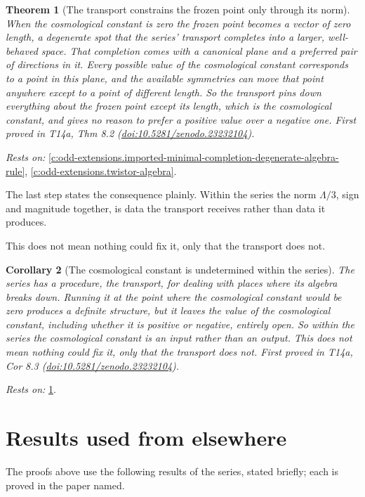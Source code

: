 \documentclass[11pt]{article}
\newtheorem{theorem}{Theorem}[section]
\newtheorem{corollary}[theorem]{Corollary}
\theoremstyle{definition}
\theoremstyle{plain}
\begin{document}
\begin{theorem}[The transport constrains the frozen point only through its norm]\label{c:odd-extensions.transport-constrains-frozen-point-only-through}
When the cosmological constant is zero the frozen point becomes a vector of zero length, a degenerate spot that the series' transport completes into a larger, well-behaved space. That completion comes with a canonical plane and a preferred pair of directions in it. Every possible value of the cosmological constant corresponds to a point in this plane, and the available symmetries can move that point anywhere except to a point of different length. So the transport pins down everything about the frozen point except its length, which is the cosmological constant, and gives no reason to prefer a positive value over a negative one.
\emph{First proved in} T14a, Thm 8.2 (\href{https://doi.org/10.5281/zenodo.23232104}{doi:10.5281/zenodo.23232104}).
\end{theorem}
\noindent\emph{Rests on:} \ref{c:odd-extensions.imported-minimal-completion-degenerate-algebra-rule}, \ref{c:odd-extensions.twistor-algebra}.

The last step states the consequence plainly. Within the series the norm $\Lambda/3$, sign and magnitude together, is data the transport receives rather than data it produces.

This does not mean nothing could fix it, only that the transport does not.

\begin{corollary}[The cosmological constant is undetermined within the series]\label{c:odd-extensions.cosmological-constant-undetermined-within-series}
The series has a procedure, the transport, for dealing with places where its algebra breaks down. Running it at the point where the cosmological constant would be zero produces a definite structure, but it leaves the value of the cosmological constant, including whether it is positive or negative, entirely open. So within the series the cosmological constant is an input rather than an output. This does not mean nothing could fix it, only that the transport does not.
\emph{First proved in} T14a, Cor 8.3 (\href{https://doi.org/10.5281/zenodo.23232104}{doi:10.5281/zenodo.23232104}).
\end{corollary}
\noindent\emph{Rests on:} \ref{c:odd-extensions.transport-constrains-frozen-point-only-through}.

\section{Results used from elsewhere}
The proofs above use the following results of the series, stated briefly; each is proved in the paper named.
\end{document}
